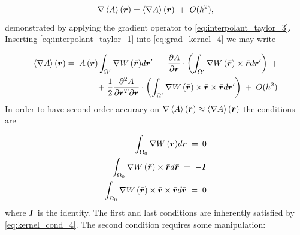 \begin{equation} \label{eq:grad_kernel_5}
\nabla \left\langle {A} \right\rangle \left( {\boldsymbol{r}} \right) = \left\langle {\nabla A} \right\rangle \left( {\boldsymbol{r}} \right) \;+\; O(h^2),
\end{equation}
%
demonstrated by applying the gradient operator to \eqref{eq:interpolant_taylor_3}. Inserting \eqref{eq:interpolant_taylor_1} into \eqref{eq:grad_kernel_4} we may write

% 
\begin{equation} \label{eq:grad_kernel_6}
\begin{split}
\left\langle {\nabla A} \right\rangle \left( {\boldsymbol{r}} \right) = \; A \left( {\boldsymbol{r}} \right)\int_{\Omega '} \nabla { W \left( \bar{\boldsymbol{r}} \right)}d{\boldsymbol{r}}' \; -\; \frac{\partial A}{\partial {\boldsymbol{r}}}\cdot \left( \int_{\Omega '} \nabla { W \left( \bar{\boldsymbol{r}} \right) \times \bar{\boldsymbol{r}} }d{\boldsymbol{r}}' \right) \;+ \\
+\; \frac{1}{2} \frac{\partial^2 A}{\partial \boldsymbol{r}^T \partial \boldsymbol{r}} \cdot\left( \int_{\Omega '} \nabla { W \left( \bar{\boldsymbol{r}}\right) \times \bar{\boldsymbol{r}} \times \bar{\boldsymbol{r}} }d{\boldsymbol{r}}' \right) \; + \; O(h^2)
\end{split}
\end{equation}
%
In order to have second-order accuracy on $\nabla \left\langle {A} \right\rangle \left( {\boldsymbol{r}} \right) \approx \left\langle {\nabla A} \right\rangle \left( {\boldsymbol{r}} \right)$ the conditions are

% 
\begin{equation} \label{eq:grad_kernel_cond_1}
\begin{split}
\int_{\Omega_0} \nabla { W \left( \bar{\boldsymbol{r}} \right)}d\bar{\boldsymbol{r}} \;=\: 0 \\
\int_{\Omega_0} \nabla { W \left( \bar{\boldsymbol{r}} \right) \times \bar{\boldsymbol{r}} }d\bar{\boldsymbol{r}} \;=\; -\boldsymbol{I} \\
\int_{\Omega_0} \nabla { W \left( \bar{\boldsymbol{r}}\right) \times \bar{\boldsymbol{r}} \times \bar{\boldsymbol{r}} }d\bar{\boldsymbol{r}} \;=\; 0
\end{split}
\end{equation}
%
where $\boldsymbol{I}$ is the identity. The first and last conditions are inherently satisfied by \eqref{eq:kernel_cond_4}. The second condition requires some manipulation:

